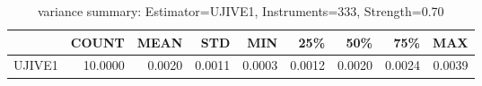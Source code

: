 \begin{table}[ht]
\centering
\caption{variance summary: Estimator=UJIVE1, Instruments=333, Strength=0.70}
\begin{tabular}{lrrrrrrrr}
\toprule
 & COUNT & MEAN & STD & MIN & 25\% & 50\% & 75\% & MAX \\
\midrule
UJIVE1 & 10.0000 & 0.0020 & 0.0011 & 0.0003 & 0.0012 & 0.0020 & 0.0024 & 0.0039 \\
\bottomrule
\end{tabular}
\end{table}
